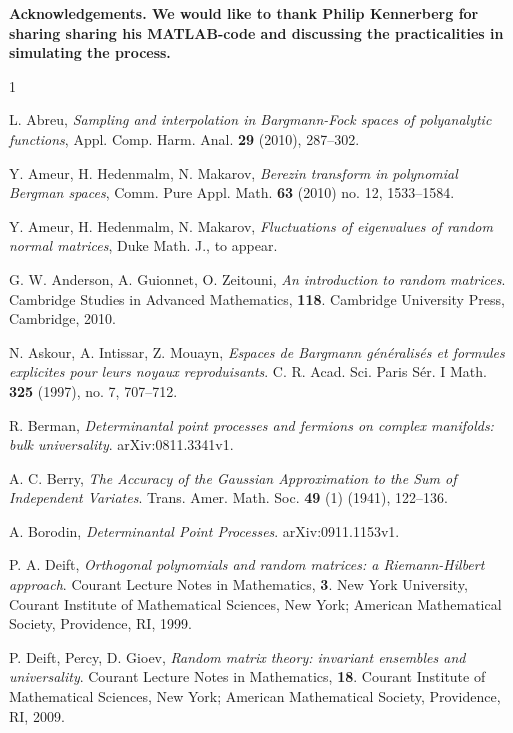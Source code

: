 \documentclass{birkart}
\theoremstyle{definition}
\theoremstyle{remark}
\numberwithin{equation}{section}
\numberwithin{figure}{section}
\newcommand{\1}{{\mathbf 1}}
\begin{document}
\noindent\bf Acknowledgements. \rm 
We would like to thank Philip Kennerberg for sharing sharing his 
MATLAB-code and discussing the practicalities in simulating 
the process. 



\begin{thebibliography}{1}

 L. Abreu, \textit{Sampling and interpolation in Bargmann-Fock  
spaces of polyanalytic functions}, Appl. Comp. Harm. Anal. {\bf29} (2010),  
287--302.

 Y. Ameur, H. Hedenmalm, N. Makarov, \textit{Berezin transform 
in polynomial Bergman spaces}, Comm. Pure Appl. Math. {\bf63} (2010) no. 12, 
1533--1584. 

 Y. Ameur, H. Hedenmalm, N. Makarov, \textit{Fluctuations of 
eigenvalues of random normal matrices}, Duke Math. J., to appear.
 
G. W. Anderson, A. Guionnet, O. Zeitouni, \textit{An introduction to random 
matrices}. Cambridge Studies in Advanced Mathematics, {\bf118}. Cambridge 
University Press, Cambridge, 2010. 

 N. Askour, A. Intissar, Z. Mouayn, \textit{Espaces de Bargmann 
g\'en\'eralis\'es et formules explicites pour leurs noyaux reproduisants}. 
C. R. Acad. Sci. Paris S\'er. I Math. {\bf325} (1997), no. 7, 
707--712. 

 R. Berman, \textit{Determinantal point processes and 
fermions on complex manifolds: bulk universality}. arXiv:0811.3341v1.

 A. C. Berry, \textit{The Accuracy of the Gaussian 
Approximation to the Sum of Independent Variates}. Trans. Amer. Math. Soc. 
{\bf49} (1) (1941), 122–136.

 A. Borodin, \textit{Determinantal Point Processes}. 
arXiv:0911.1153v1. 

 P. A. Deift, \textit{Orthogonal polynomials and random 
matrices: a Riemann-Hilbert approach}. Courant Lecture Notes in Mathematics, 
{\bf3}. New York University, Courant Institute of Mathematical Sciences, 
New York; American Mathematical Society, Providence, RI, 1999. 

 P. Deift, Percy, D. Gioev, \textit{Random matrix theory: 
invariant ensembles and universality}. Courant Lecture Notes in Mathematics, 
{\bf18}. Courant Institute of Mathematical Sciences, New York; American 
Mathematical Society, Providence, RI, 2009. 


\end{thebibliography}
\end{document}
